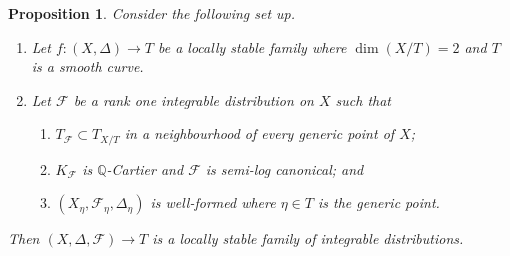 \documentclass[12pt, a4paper]{amsart}
\newtheorem{proposition}[theorem]{Proposition}
\theoremstyle{definition}
\theoremstyle{named}
\begin{document}
\begin{proposition}
\label{prop_family_criterion}
Consider the following set up.
\begin{enumerate}
\item Let $f\colon (X, \Delta) \rightarrow T$ be a locally stable family where $\dim (X/T) = 2$ and $T$ is a smooth curve.
\item Let $\mathcal F$ be a rank one integrable distribution
 on 
$X$ such that 
\begin{enumerate}
  \item $T_{\mathcal F} \subset T_{X/T}$ in a neighbourhood of every generic point of $X$; \item $K_{\mathcal F}$ is $\mathbb Q$-Cartier and  $\mathcal F$ is 
semi-log canonical; and 
\item $(X_\eta, \mathcal F_\eta, \Delta_\eta)$ is well-formed where $\eta \in T$ is the generic point.
\end{enumerate}
\end{enumerate}



Then $(X, \Delta, \mathcal F) \rightarrow T$ is a locally stable family of integrable distributions.
\end{proposition}
\end{document}

